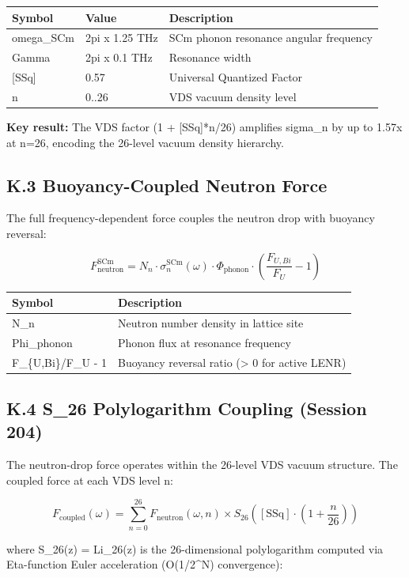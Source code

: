 \documentclass[11pt]{article}
\begin{document}
\begin{center}
\begin{longtable}{lll}
\toprule
Symbol & Value & Description \tabularnewline
\midrule
\endhead
omega\_SCm & 2pi x 1.25 THz & SCm phonon resonance angular frequency \tabularnewline
Gamma & 2pi x 0.1 THz & Resonance width \tabularnewline
{}[SSq] & 0.57 & Universal Quantized Factor \tabularnewline
n & 0..26 & VDS vacuum density level \tabularnewline
\bottomrule
\end{longtable}
\end{center}

\textbf{Key result:} The VDS factor (1 + [SSq]*n/26) amplifies sigma\_n by up to 1.57x at n=26, encoding the 26-level vacuum density hierarchy.

\subsection*{K.3 Buoyancy-Coupled Neutron Force}

The full frequency-dependent force couples the neutron drop with buoyancy reversal:

$$F_{\mathrm{neutron}}^{\mathrm{SCm}} = N_n \cdot \sigma_n^{\mathrm{SCm}}(\omega) \cdot \Phi_{\mathrm{phonon}} \cdot \left(\frac{F_{U,Bi}}{F_U} - 1\right)$$

\begin{center}
\begin{longtable}{ll}
\toprule
Symbol & Description \tabularnewline
\midrule
\endhead
N\_n & Neutron number density in lattice site \tabularnewline
Phi\_phonon & Phonon flux at resonance frequency \tabularnewline
F\_\{U,Bi\}/F\_U - 1 & Buoyancy reversal ratio (> 0 for active LENR) \tabularnewline
\bottomrule
\end{longtable}
\end{center}

\subsection*{K.4 S\_26 Polylogarithm Coupling (Session 204)}

The neutron-drop force operates within the 26-level VDS vacuum structure. The coupled force at each VDS level n:

$$F_{\mathrm{coupled}}(\omega) = \sum_{n=0}^{26} F_{\mathrm{neutron}}(\omega, n) \times S_{26}\!\left([\text{SSq}] \cdot \left(1 + \frac{n}{26}\right)\right)$$

where S\_26(z) = Li\_26(z) is the 26-dimensional polylogarithm computed via Eta-function Euler acceleration (O(1/2\textasciicircum{}N) convergence):
\end{document}
